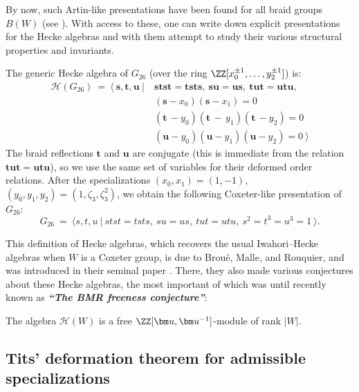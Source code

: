 By now, such Artin-like presentations have been found for all braid groups $B(W)$ (see \cite[Appendix~A.2]{broue-book-braid-groups}). With access to these, one can write down explicit presentations for the Hecke algebras and with them attempt to study their various structural properties and invariants.

\begin{exam}\label{Example Hecke algebra of G_26}
The generic Hecke algebra of $G_{26}$ (over the ring $\ZZ[x_0^{\pm 1},\ldots, y_2^{\pm 1}]$) is:
\begin{align*}
\mathcal{H}(G_{26})\ = \ \langle\ \bm s,\bm t,\bm u\ |\ &\bm{stst}=\bm{tsts},\ \bm{su}=\bm{us},\ \bm{tut}=\bm{utu},\\
&(\bm s-x_0)(\bm s-x_1)=0\\
&(\bm t\,-y_0)(\bm t\,-\,y_1)(\bm t\,-y_2)=0\\
&(\bm u-y_0)(\bm u-y_1)(\bm u-y_2)=0\ \rangle
\end{align*}
The braid reflections $\bm t$ and $\bm u$ are conjugate (this is immediate from the relation $\bm{tut}=\bm{utu}$), so we use the same set of variables for their deformed order relations. After the specializations $(x_0,x_1)=(1,-1)$, $(y_0,y_1,y_2)=(1,\zeta_3,\zeta_3^2)$,  we obtain the following Coxeter-like presentation of $G_{26}$:$$ G_{26}\ =\ \langle s,t,u\ |\ stst=tsts,\ su=us,\ tut=utu,\ s^2=t^3=u^3=1\ \rangle.$$
\end{exam}


This definition of Hecke algebras, which recovers the usual Iwahori--Hecke algebras when $W$ is a Coxeter group, is due to Brou\'e, Malle, and Rouquier, and was introduced in their seminal paper \cite{broue-malle-rouquier-braid-hecke}. There, they also made various conjectures about these Hecke algebras, the most important of which was until recently known as \textbf{\textit{``The BMR freeness conjecture''}}:

\begin{theo*}

The algebra $\mathcal{H}(W)$ is a free $\ZZ[\bm u,\bm u^{-1}]$-module of rank $|W|$.
\end{theo*} 

\subsection{Tits' deformation theorem for admissible specializations}


